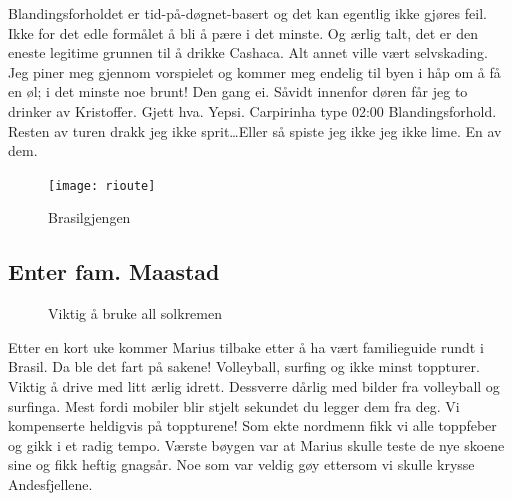 Blandingsforholdet er tid-på-døgnet-basert og det kan egentlig ikke
gjøres feil. Ikke for det edle formålet  å bli å pære i det minste.
Og ærlig talt, det er den eneste legitime grunnen til å drikke
Cashaca. Alt annet ville vært selvskading. Jeg piner meg gjennom
vorspielet og kommer meg endelig til byen i håp om å få en øl; i det
minste noe brunt! Den gang ei. Såvidt innenfor døren får jeg to
drinker av Kristoffer. Gjett hva. Yepsi. Carpirinha type 02:00
Blandingsforhold. Resten av turen drakk jeg ikke sprit\ldots Eller så
spiste jeg ikke jeg ikke lime. En av dem.

\begin{figure}[H]
	\centering
	\texttt{[image: rioute]}
	\caption*{Brasilgjengen}
	\label{fig:brasil}
\end{figure}


\clearpage
\subsection{Enter fam. Maastad}
\begin{figure}[H]
	\centering
	
	\noindent{}
	\caption*{Viktig å bruke all solkremen}
\label{fig:predradegavea}
\end{figure}
Etter en kort uke kommer Marius tilbake etter å ha vært familieguide
rundt i
Brasil. Da ble det fart på sakene!
Volleyball, surfing og ikke minst toppturer. Viktig å drive med litt
ærlig idrett. Dessverre dårlig med bilder fra volleyball og surfinga.
Mest fordi mobiler blir stjelt sekundet du legger dem fra deg. Vi
kompenserte heldigvis på toppturene! Som ekte nordmenn fikk vi
alle toppfeber og gikk i et radig tempo. Værste bøygen var at Marius
skulle teste de nye skoene sine og fikk heftig gnagsår. Noe som var
veldig gøy ettersom vi skulle krysse Andesfjellene. 


